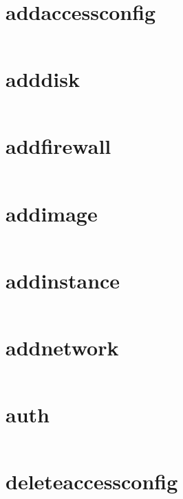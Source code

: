 \section{addaccessconfig}
\begin{lstlisting}[language=Bash]
\end{lstlisting}

\section{adddisk}
\begin{lstlisting}[language=Bash]
\end{lstlisting}

\section{addfirewall}
\begin{lstlisting}[language=Bash]
\end{lstlisting}

\section{addimage}
\begin{lstlisting}[language=Bash]
\end{lstlisting}

\section{addinstance}
\begin{lstlisting}[language=Bash]
\end{lstlisting}

\section{addnetwork}
\begin{lstlisting}[language=Bash]
\end{lstlisting}

\section{auth}
\begin{lstlisting}[language=Bash]
\end{lstlisting}

\section{deleteaccessconfig}
\begin{lstlisting}[language=Bash]
\end{lstlisting}

